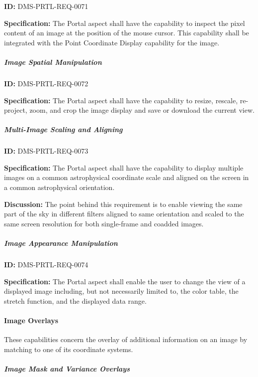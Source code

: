 \documentclass[SE,toc,lsstdraft]{lsstdoc}
\begin{document}
\label{DMS-PRTL-REQ-0071}
\textbf{ID:} DMS-PRTL-REQ-0071

\textbf{Specification:}
The Portal aspect shall have the capability to inspect the pixel content of an image at the position of the mouse cursor.  This capability shall be integrated with the Point Coordinate Display capability for the image.

\subparagraph{Image Spatial Manipulation}\hfill  %

\label{DMS-PRTL-REQ-0072}
\textbf{ID:} DMS-PRTL-REQ-0072

\textbf{Specification:}
The Portal aspect shall have the capability to resize, rescale, re-project, zoom, and crop the image display and save or download the current view.

\subparagraph{Multi-Image Scaling and Aligning}\hfill  %

\label{DMS-PRTL-REQ-0073}
\textbf{ID:} DMS-PRTL-REQ-0073

\textbf{Specification:}
The Portal aspect shall have the capability to display multiple images on a common astrophysical coordinate scale and aligned on the screen in a common astrophysical orientation.

\textbf{Discussion:}
The point behind this requirement is to enable viewing the same part of the sky in different filters aligned to same orientation and scaled to the same screen resolution for both single-frame and coadded images.

\subparagraph{Image Appearance Manipulation}\hfill  %

\label{DMS-PRTL-REQ-0074}
\textbf{ID:} DMS-PRTL-REQ-0074

\textbf{Specification:}
The Portal aspect shall enable the user to change the view of a displayed image including, but not necessarily limited to, the color table, the stretch function, and the displayed data range.

\paragraph{Image Overlays}\hfill  %

These capabilities concern the overlay of additional information on an image by matching to one of its coordinate systems.

\subparagraph{Image Mask and Variance Overlays}\hfill  %
\end{document}
